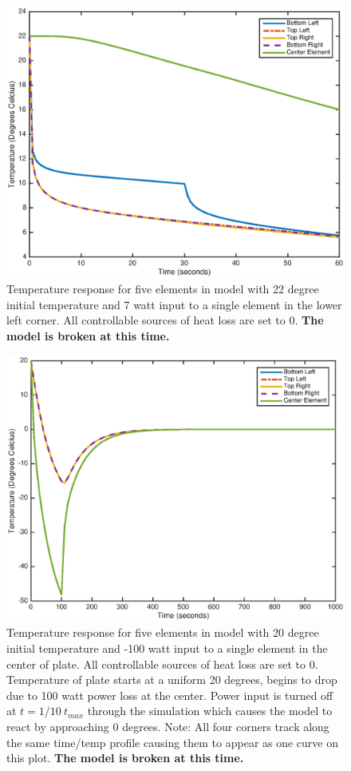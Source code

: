 \documentclass[10pt,twocolumn]{article}
\begin{document}
\begin{figure}
	\center
	\includegraphics[width=0.8\linewidth]{TempResponse22.eps}
	\caption{Temperature response for five elements in model with 22 degree initial temperature and 7 watt input to a single element in the lower left corner. All controllable sources of heat loss are set to 0. \textbf{The model is broken at this time.}}
	\label{fig:TempRespsonse22}
\end{figure}

\begin{figure}
	\center
	\includegraphics[width=0.8\linewidth]{TempResponse,it20,pi-100.eps}
	\caption{Temperature response for five elements in model with 20 degree initial temperature and -100 watt input to a single element in the center of plate. All controllable sources of heat loss are set to 0. Temperature of plate starts at a uniform 20 degrees, begins to drop due to 100 watt power loss at the center. Power input is turned off at $t=1/10\ t_{max}$ through the simulation which causes the model to react by approaching 0 degrees. Note: All four corners track along the same time/temp profile causing them to appear as one curve on this plot. \textbf{The model is broken at this time.}}
	\label{fig:TempResponse,it20,pi-100}
\end{figure}
\end{document}
